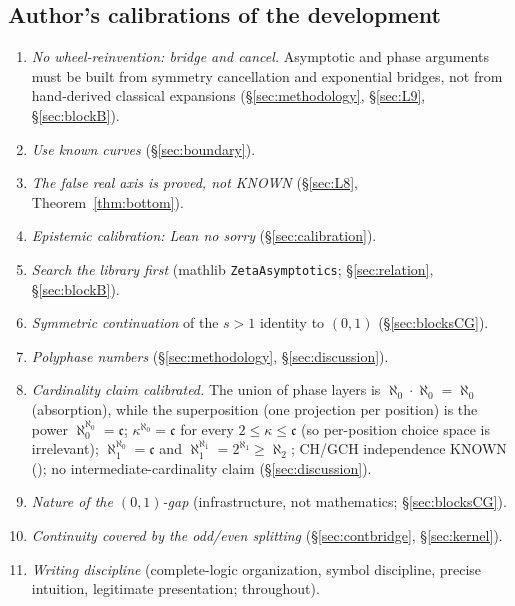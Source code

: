 \documentclass{article}
\begin{document}
\subsection*{Author's calibrations of the development}
\begin{enumerate}
\item \emph{No wheel-reinvention: bridge and cancel.} Asymptotic and phase
arguments must be built from symmetry cancellation and exponential bridges,
not from hand-derived classical expansions (\S\ref{sec:methodology},
\S\ref{sec:L9}, \S\ref{sec:blockB}).
\item \emph{Use known curves} (\S\ref{sec:boundary}).
\item \emph{The false real axis is proved, not KNOWN}
(\S\ref{sec:L8}, Theorem~\ref{thm:bottom}).
\item \emph{Epistemic calibration: Lean no sorry}
(\S\ref{sec:calibration}).
\item \emph{Search the library first} (mathlib \texttt{ZetaAsymptotics};
\S\ref{sec:relation}, \S\ref{sec:blockB}).
\item \emph{Symmetric continuation} of the $s>1$ identity to $(0,1)$
(\S\ref{sec:blocksCG}).
\item \emph{Polyphase numbers} (\S\ref{sec:methodology},
\S\ref{sec:discussion}).
\item \emph{Cardinality claim calibrated.} The union of phase layers is
$\aleph_0\cdot\aleph_0=\aleph_0$ (absorption), while the superposition
(one projection per position) is the power
$\aleph_0^{\aleph_0}=\mathfrak c$; $\kappa^{\aleph_0}=\mathfrak c$ for
every $2\le\kappa\le\mathfrak c$ (so per-position choice space is
irrelevant); $\aleph_1^{\aleph_0}=\mathfrak c$ and
$\aleph_1^{\aleph_1}=2^{\aleph_1}\ge\aleph_2$; CH/GCH independence KNOWN
(\cite{cohen}); no intermediate-cardinality claim
(\S\ref{sec:discussion}).
\item \emph{Nature of the $(0,1)$-gap} (infrastructure, not mathematics;
\S\ref{sec:blocksCG}).
\item \emph{Continuity covered by the odd/even splitting}
(\S\ref{sec:contbridge}, \S\ref{sec:kernel}).
\item \emph{Writing discipline} (complete-logic organization, symbol
discipline, precise intuition, legitimate presentation; throughout).
\end{enumerate}
\end{document}
